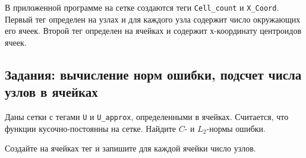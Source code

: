 \documentclass[a4paper, 11pt]{article}
\begin{document}
В приложенной программе на сетке создаются теги \texttt{Cell\_count} и \texttt{X\_Coord}. Первый тег определен на узлах и для каждого узла содержит число окружающих его ячеек. Второй тег определен на ячейках и содержит х-координату центроидов ячеек.

\subsection{Задания: вычисление норм ошибки, подсчет числа узлов в ячейках}
Даны сетки с тегами \texttt{U} и \texttt{U\_approx}, определенными в ячейках. Считается, что функции кусочно-постоянны на сетке. Найдите $C$- и $L_2$-нормы ошибки.

Создайте на ячейках тег и запишите для каждой ячейки число узлов.
\end{document}
